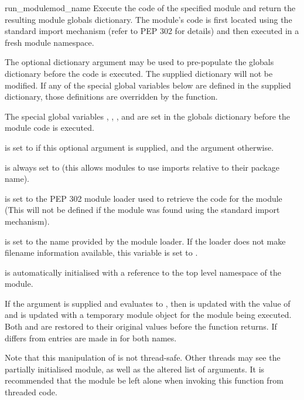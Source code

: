 \begin{funcdesc}{run_module}{mod_name
}
Execute the code of the specified module and return the resulting
module globals dictionary. The module's code is first located using
the standard import mechanism (refer to PEP 302 for details) and
then executed in a fresh module namespace.

The optional dictionary argument  may be used to
pre-populate the globals dictionary before the code is executed.
The supplied dictionary will not be modified. If any of the special
global variables below are defined in the supplied dictionary, those
definitions are overridden by the  function.

The special global variables , ,
,  and  are
set in the globals dictionary before the module code is executed.

 is set to  if this optional argument is
supplied, and the  argument otherwise.

 is always set to  (this allows
modules to use imports relative to their package name).

 is set to the PEP 302 module loader used to retrieve
the code for the module (This will not be defined if the module was
found using the standard import mechanism).

 is set to the name provided by the module loader. If
the loader does not make filename information available, this
variable is set to .

 is automatically initialised with a reference to
the top level namespace of the  module.

If the argument  is supplied and evaluates to
, then  is updated with the value of
 and  is updated with a
temporary module object for the module being executed. Both
 and  are restored to
their original values before the function returns. If 
differs from  entries are made in 
for both names.

Note that this manipulation of  is not thread-safe. Other
threads may see the partially initialised module, as well as the
altered list of arguments. It is recommended that the 
module be left alone when invoking this function from threaded code.
\end{funcdesc}

\begin{seealso}


\end{seealso}
